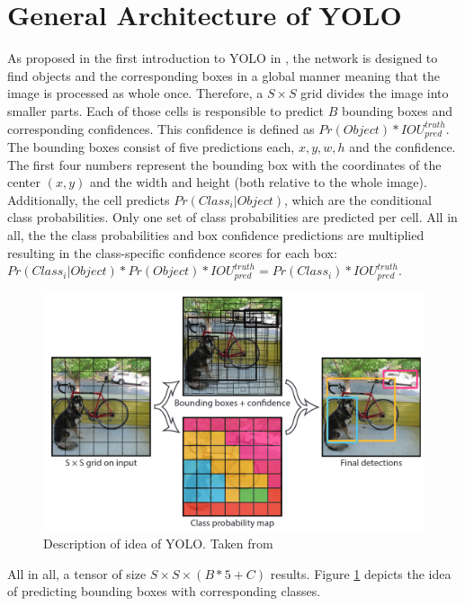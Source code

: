 \section{General Architecture of YOLO}
As proposed in the first introduction to YOLO in \cite{yolov1}, the network is designed to find objects and the corresponding boxes in a global manner meaning that the image is processed as whole once. Therefore, a $ S \times S $ grid divides the image into smaller parts. Each of those cells is responsible to predict $ B $ bounding boxes and corresponding confidences. This confidence is defined as $ Pr(Object) * IOU_{pred}^{truth} $. The bounding boxes consist of five predictions each, $ x, y, w, h $ and the confidence. The first four numbers represent the bounding box with the coordinates of the center $ (x,y) $ and the width and height (both relative to the whole image). Additionally, the cell predicts $ Pr(Class_i|Object) $, which are the conditional class probabilities. Only one set of class probabilities are predicted per cell. All in all, the the class probabilities and box confidence predictions are multiplied resulting in the class-specific confidence scores for each box: $ Pr(Class_i|Object) * Pr(Object) * IOU_{pred}^{truth} = Pr(Class_i) * IOU_{pred}^{truth} $.
 
\begin{figure}[htb!]
	\centering
	\includegraphics[scale=0.25]{figures/YOLO_functionality.png}
	\caption{Description of idea of YOLO. Taken from \cite{yolov1}}
	\label{fig:YOLO_idea}
\end{figure}

All in all, a tensor of size $ S \times S \times (B * 5 + C) $ results. Figure \ref{fig:YOLO_idea} depicts the idea of predicting bounding boxes with corresponding classes. \\

